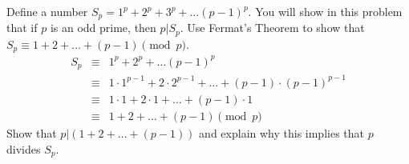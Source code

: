 \documentclass[12pt,oneside]{article}
\begin{document}
\begin{problem}{10}
Define a number
$S_p = 1^p + 2^p +3^p + \ldots (p-1)^p.$
You will show in this problem that if $p$ is an odd prime, then $p|S_p$.
\bparts
{}
 Use Fermat's Theorem to show that $S_p \equiv 1+2+\ldots + (p-1) \pmod p$.
 \solution
 {
 \begin{eqnarray*}
 S_p &\equiv& 1^p + 2^p + \ldots (p-1)^p\\
 & \equiv& 1\cdot1^{p-1} + 2\cdot2^{p-1} + \ldots + (p-1)\cdot (p-1)^{p-1}\\
 & \equiv& 1\cdot 1 + 2 \cdot 1 + \ldots + (p-1) \cdot 1\\
 & \equiv & 1 + 2 + \ldots + (p-1) \pmod p
 \end{eqnarray*}
 }
 Show that $p|(1+2+\ldots + (p-1))$ and explain why this implies that $p$ divides $S_p$.
 \eparts
 \end{problem}


\newpage
\end{document}
